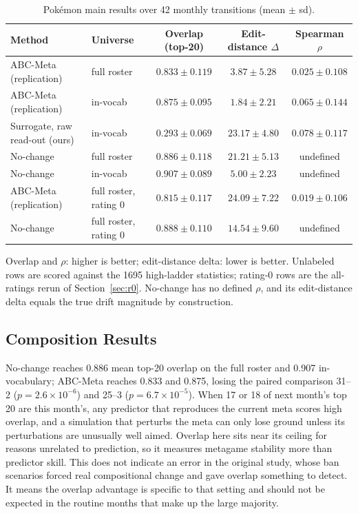 \documentclass[journal]{IEEEtran}
\newcommand{\pkmn}{Pok\'emon}
\begin{document}
\begin{table}[t]
\caption{\pkmn{} main results over 42 monthly transitions (mean $\pm$ sd).}
\label{tab:main}
\centering
\begin{tabular}{@{}llccc@{}}
\toprule
Method & Universe & Overlap (top-20) & Edit-distance $\Delta$ & Spearman $\rho$ \\
\midrule
ABC-Meta (replication) & full roster & $0.833 \pm 0.119$ & $3.87 \pm 5.28$ & $0.025 \pm 0.108$ \\
ABC-Meta (replication) & in-vocab & $0.875 \pm 0.095$ & $1.84 \pm 2.21$ & $0.065 \pm 0.144$ \\
Surrogate, raw read-out (ours) & in-vocab & $0.293 \pm 0.069$ & $23.17 \pm 4.80$ & $0.078 \pm 0.117$ \\
No-change & full roster & $0.886 \pm 0.118$ & $21.21 \pm 5.13$ & undefined \\
No-change & in-vocab & $0.907 \pm 0.089$ & $5.00 \pm 2.23$ & undefined \\
\midrule
ABC-Meta (replication) & full roster, rating 0 & $0.815 \pm 0.117$ & $24.09 \pm 7.22$ & $0.019 \pm 0.106$ \\
No-change & full roster, rating 0 & $0.888 \pm 0.110$ & $14.54 \pm 9.60$ & undefined \\
\bottomrule
\end{tabular}
\par\vspace{3pt}
\begin{minipage}{\textwidth}\footnotesize
Overlap and $\rho$: higher is better; edit-distance delta: lower is better.
Unlabeled rows are scored against the 1695 high-ladder statistics; rating-0
rows are the all-ratings rerun of Section~\ref{sec:r0}. No-change has no
defined $\rho$, and its edit-distance delta equals the true drift magnitude
by construction.
\end{minipage}
\end{table}

\subsection{Composition Results}

No-change reaches 0.886 mean top-20 overlap on the full roster and
0.907 in-vocabulary; ABC-Meta reaches 0.833 and 0.875, losing the paired
comparison 31--2 ($p=2.6\times10^{-6}$) and 25--3 ($p=6.7\times10^{-5}$).
When 17 or 18 of next month's top 20 are this month's, any predictor that
reproduces the current meta scores high overlap, and a simulation that
perturbs the meta can only lose ground unless its perturbations are
unusually well aimed. Overlap here sits near its ceiling for reasons
unrelated to prediction, so it measures metagame stability more than
predictor skill. This does not indicate an error in the original study,
whose ban scenarios forced real compositional change and gave overlap
something to detect. It means the overlap advantage is specific to that
setting and should not be expected in the routine months that make up the
large majority.
\end{document}
